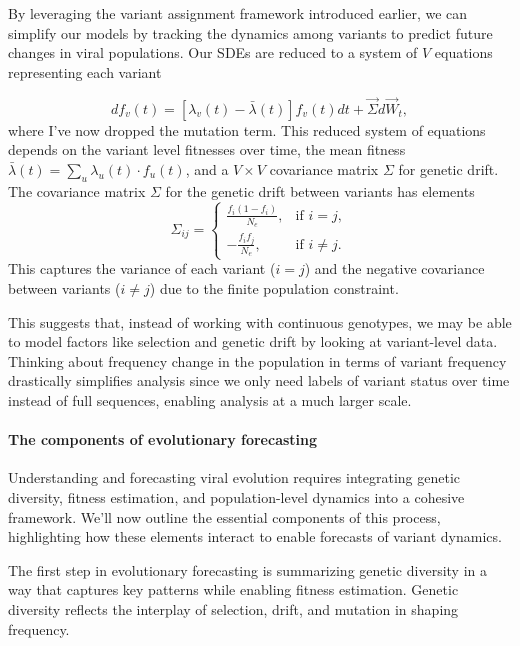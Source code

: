 By leveraging the variant assignment framework introduced earlier, we can simplify our models by tracking the dynamics among variants to predict future changes in viral populations.
Our SDEs are reduced to a system of $V$ equations representing each variant

\begin{equation}
  df_v(t) = \left[\lambda_{v}(t) - \bar{\lambda}(t)\right] f_v(t) dt + \vec{\Sigma} d\vec{W}_{t},
\end{equation}
where I've now dropped the mutation term.
This reduced system of equations depends on the variant level fitnesses over time, the mean fitness $\bar{\lambda}(t) = \sum_{u} \lambda_u(t)\cdot f_u(t)$, and a $V \times V$ covariance matrix $\Sigma$ for genetic drift.
The covariance matrix $\Sigma$ for the genetic drift between variants has elements
\begin{equation}
\Sigma_{ij} = \begin{cases}
  \frac{f_i (1 - f_i)}{N_e}, & \text{if } i = j, \\
  -\frac{f_i f_j}{N_e}, & \text{if } i \neq j.
\end{cases}
\end{equation}
This captures the variance of each variant ($i = j$) and the negative covariance between variants ($i \neq j$) due to the finite population constraint.

This suggests that, instead of working with continuous genotypes, we may be able to model factors like selection and genetic drift by looking at variant-level data.
Thinking about frequency change in the population in terms of variant frequency drastically simplifies analysis since we only need labels of variant status over time instead of full sequences, enabling analysis at a much larger scale.

\paragraph{The components of evolutionary forecasting}

Understanding and forecasting viral evolution requires integrating genetic diversity, fitness estimation, and population-level dynamics into a cohesive framework.
We'll now outline the essential components of this process, highlighting how these elements interact to enable forecasts of variant dynamics.

The first step in evolutionary forecasting is summarizing genetic diversity in a way that captures key patterns  while enabling fitness estimation.
Genetic diversity reflects the interplay of selection, drift, and mutation in shaping frequency.

